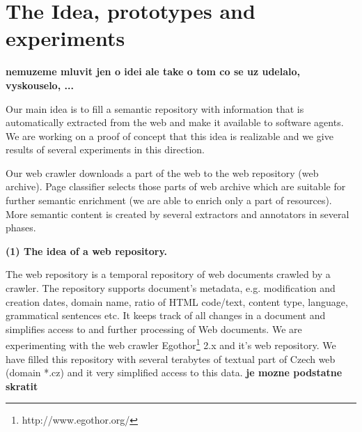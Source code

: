 \documentclass{www2009-submission}
\begin{document}
\section{The Idea, prototypes and experiments}


{\bf nemuzeme mluvit jen o idei ale take o tom co se uz udelalo, vyskouselo, ...}

Our main idea is to fill a semantic repository with information that is automatically extracted from the web and make it available to software agents. We are working on a proof of concept that this idea is realizable and we give results of several experiments in this direction.

Our web crawler %
downloads a part of the web to the web repository (web archive). 
Page classifier selects those parts of web archive which are suitable for further semantic enrichment (we are able to enrich only a part of resources). More semantic content is created by several extractors and annotators in several phases. %



\textbf{(1) The idea of a web repository.}  



The web repository is a temporal repository of web documents crawled by a crawler. The repository supports document's metadata, e.g. modification and creation dates, domain name, ratio of HTML code/text, content type, language, grammatical sentences etc. It keeps track of all changes in a document and simplifies access to and further processing of Web documents. We are experimenting with the web crawler Egothor\footnote{http://www.egothor.org/} 2.x and it's web repository. We have filled this repository with several terabytes of textual part of Czech web (domain *.cz) and it very simplified access to this data. {\bf je mozne podstatne skratit}
\end{document}

